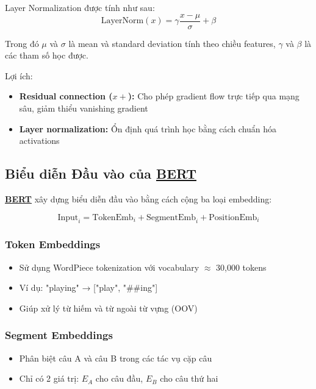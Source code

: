 Layer Normalization được tính như sau:
\begin{equation}
\text{LayerNorm}(x) = \gamma \frac{x - \mu}{\sigma} + \beta
\label{eq:layernorm}
\end{equation}

Trong đó $\mu$ và $\sigma$ là mean và standard deviation tính theo chiều features, $\gamma$ và $\beta$ là các tham số học được.

Lợi ích:
\begin{itemize}
    \item \textbf{Residual connection ($x +$):} Cho phép gradient flow trực tiếp qua mạng sâu, giảm thiểu vanishing gradient
    \item \textbf{Layer normalization:} Ổn định quá trình học bằng cách chuẩn hóa activations
\end{itemize}

\subsection{Biểu diễn Đầu vào của \hyperref[acro:bert]{\textbf{BERT}}}
\label{ssec:input_representation_bert}

\hyperref[acro:bert]{\textbf{BERT}} xây dựng biểu diễn đầu vào bằng cách cộng ba loại embedding:

\begin{equation}
\text{Input}_i = \text{TokenEmb}_i + \text{SegmentEmb}_i + \text{PositionEmb}_i
\label{eq:input_embedding}
\end{equation}

\subsubsection{Token Embeddings}
\begin{itemize}
    \item Sử dụng WordPiece tokenization \cite{wu2016google} với vocabulary $\approx$ 30,000 tokens
    \item Ví dụ: "playing" → ["play", "\#\#ing"]
    \item Giúp xử lý từ hiếm và từ ngoài từ vựng (OOV)
\end{itemize}

\subsubsection{Segment Embeddings}  
\begin{itemize}
    \item Phân biệt câu A và câu B trong các tác vụ cặp câu
    \item Chỉ có 2 giá trị: $E_A$ cho câu đầu, $E_B$ cho câu thứ hai
\end{itemize}

